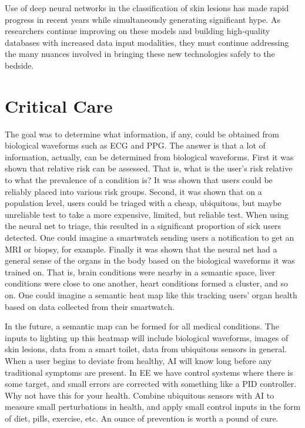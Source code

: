 Use of deep neural networks in the classification of skin lesions has made rapid progress in recent years while simultaneously generating significant hype. As researchers continue improving on these models and building high-quality databases with increased data input modalities, they must continue addressing the many nuances involved in bringing these new technologies safely to the bedside.

\section{Critical Care}

The goal was to determine what information, if any, could be obtained from biological waveforms such as ECG and PPG.  The answer is that a lot of information, actually, can be determined from biological waveforms.  First it was shown that relative risk can be assessed.  That is, what is the user's risk relative to what the prevalence of a condition is?  It was shown that users could be reliably placed into various risk groups.  Second, it was shown that on a population level, users could be triaged with a cheap, ubiquitous, but maybe unreliable test to take a more expensive, limited, but reliable test.  When using the neural net to triage, this resulted in a significant proportion of sick users detected.  One could imagine a smartwatch sending users a notification to get an MRI or biopsy, for example.  Finally it was shown that the neural net had a general sense of the organs in the body based on the biological waveforms it was trained on.  That is, brain conditions were nearby in a semantic space, liver conditions were close to one another, heart conditions formed a cluster, and so on.  One could imagine a semantic heat map like this tracking users' organ health based on data collected from their smartwatch.

In the future, a semantic map can be formed for all medical conditions.  The inputs to lighting up this heatmap will include biological waveforms, images of skin lesions, data from a smart toilet, data from ubiquitous sensors in general.  When a user begins to deviate from healthy, AI will know long before any traditional symptoms are present.  In EE we have control systems where there is some target, and small errors are corrected with something like a PID controller.  Why not have this for your health.  Combine ubiquitous sensors with AI to measure small perturbations in health, and apply small control inputs in the form of diet, pills, exercise, etc.  An ounce of prevention is worth a pound of cure.